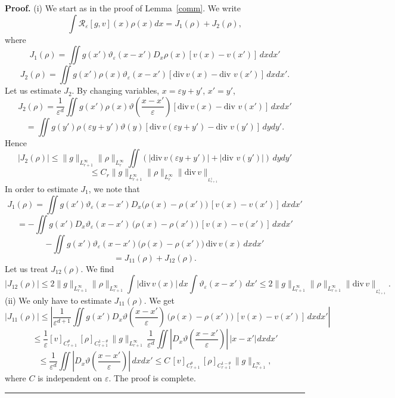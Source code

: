 \documentclass[a4paper,11pt]{article}
\newenvironment{proof}[1][Proof]{\textbf{#1.} }{\ \rule{0.5em}{0.5em}}
\newcommand{\eps}{\varepsilon}
\begin{document}
\begin{proof} (i) We start as in the proof of Lemma~\ref{comm}.
  We write
$$
\int\mathcal{R}_{\varepsilon}\left[  g,v\right]  \left( x\right)
\rho\left(  x\right)  dx = J_1(\rho) + J_2 (\rho), $$ where
$$
J_1(\rho) =    \iint g(x') \vartheta_{\varepsilon}(x-x')D_{x}\rho(x)
[v(x)-v(x')]   \, dx dx'
$$
$$
 J_2 (\rho) =  \iint g(x')  \rho(x)
  \vartheta_{\varepsilon}(x-x')[ {\mathrm{div}\,}  v(x)- {\mathrm{div}\,} \,  v(x') ] \, dx dx' .
$$
Let us estimate $J_2$. By changing variables, $x = \eps y + y'$,
 $x' =y'$,
$$
J_2 (\rho) =  \frac{1}{\eps^d}\iint g(x')  \rho(x)
  \vartheta(\frac{x-x'}{\eps})
  [ {\mathrm{div}\,}  v(x)- {\mathrm{div}\,} \,  v(x') ] \, dx dx'
$$
$$
=\iint g(y')  \rho( \eps y + y' )
  \vartheta( y)
  [ {\mathrm{div}\,}  v(\eps y + y')- {\mathrm{div}\,} \,  v(y') ] \, dy dy'.
$$
Hence
$$
|J_2 (\rho)| \le \| g\|_{L^{\infty}_{r+1}} \|
\rho\|_{L^{\infty}_{r}} \iint
 ( |{\mathrm{div}\,}  v(\eps y + y')| +  |{\mathrm{div}\,} \,  v(y') |) \, dy dy'
$$
$$
\le  C_r \| g\|_{L^{\infty}_{r+1}} \| \rho\|_{L^{\infty}_{r}}
 \| {\mathrm{div}\,} v
\|_{_{L_{r+1}^{1}}}
$$
In order to estimate $J_1$, we note that
$$
J_1(\rho) =    \iint g(x') \vartheta_{\varepsilon}(x-x')D_{x} \big(
\rho(x) - \rho(x') \big)\,   [v(x)-v(x')]   \, dx dx'
$$
$$
= -  \iint g(x') D_x \vartheta_{\eps} ({x-x'}) \, \big( \rho(x) -
\rho(x') \big)\, [v(x)-v(x')] \, dx dx'
$$ $$ -
\iint g(x') \vartheta_{\varepsilon}(x-x') \big( \rho(x) - \rho(x')
\big)\,   {\mathrm{div}\,} v(x)   \, dx dx' $$ $$ = J_{11}(\rho) +
J_{12}(\rho).
$$
Let us treat $J_{12}(\rho)$. We find
$$
|J_{12}(\rho)| \le 2 \| g\|_{L^{\infty}_{r+1}} \| \rho
 \|_{L^{\infty}_{r+1}} \int  |{\mathrm{div}\,} v(x)|   \, dx  \int
  \vartheta_{\varepsilon}(x-x')
  \,  dx' \le 2\| g\|_{L^{\infty}_{r+1}} \| \rho
 \|_{L^{\infty}_{r+1}}  \| {\mathrm{div}\,} v
\|_{_{L_{r+1}^{1}}}.
$$
(ii) We only have to estimate  $J_{11}(\rho)$.
 We get
$$
|J_{11}(\rho)| \le \left|
  \frac{1}{\eps^{d +1}}
  \iint g(x') D_x \vartheta (\frac{x-x'}{\eps}) \,
\big( \rho(x) - \rho(x') \big)\, [v(x)-v(x')] \, dx dx' \right|
$$
$$
\le \frac{1}{\eps} [ v ]_{C^{\theta}_{r+1}}  \, [ \rho ]_{C^{1-
\theta}_{r+1}} \,
 \| g \|_{L^{\infty}_{r+1}}\, \frac{1}{\eps^{d }}
  \iint  | D_x \vartheta (\frac{x-x'}{\eps})|  \,
 |x - x'|^{  }   dx dx'
$$
$$
 \le
   \frac{1}{\eps^{d }} \iint  | D_x \vartheta (\frac{x-x'}{\eps})|  \,
    dx dx' \le C \, [ v ]_{C^{\theta}_{r+1}}  \, [ \rho
]_{C^{1- \theta}_{r+1}} \,
 \| g \|_{L^{\infty}_{r+1}},
$$
where $C$ is independent on $\eps$. The proof is complete.
\end{proof}
\end{document}
